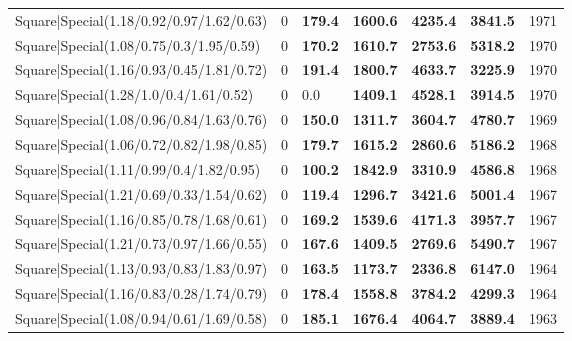 \begin{tabular}{lrllllr}
 Square|Special(1.18/0.92/0.97/1.62/0.63)                      &             0   & \textbf{179.4} & \textbf{1600.6} & \textbf{4235.4} & \textbf{3841.5} &         1971 \\
 Square|Special(1.08/0.75/0.3/1.95/0.59)                       &             0   & \textbf{170.2} & \textbf{1610.7} & \textbf{2753.6} & \textbf{5318.2} &         1970 \\
 Square|Special(1.16/0.93/0.45/1.81/0.72)                      &             0   & \textbf{191.4} & \textbf{1800.7} & \textbf{4633.7} & \textbf{3225.9} &         1970 \\
 Square|Special(1.28/1.0/0.4/1.61/0.52)                        &             0   & 0.0            & \textbf{1409.1} & \textbf{4528.1} & \textbf{3914.5} &         1970 \\
 Square|Special(1.08/0.96/0.84/1.63/0.76)                      &             0   & \textbf{150.0} & \textbf{1311.7} & \textbf{3604.7} & \textbf{4780.7} &         1969 \\
 Square|Special(1.06/0.72/0.82/1.98/0.85)                      &             0   & \textbf{179.7} & \textbf{1615.2} & \textbf{2860.6} & \textbf{5186.2} &         1968 \\
 Square|Special(1.11/0.99/0.4/1.82/0.95)                       &             0   & \textbf{100.2} & \textbf{1842.9} & \textbf{3310.9} & \textbf{4586.8} &         1968 \\
 Square|Special(1.21/0.69/0.33/1.54/0.62)                      &             0   & \textbf{119.4} & \textbf{1296.7} & \textbf{3421.6} & \textbf{5001.4} &         1967 \\
 Square|Special(1.16/0.85/0.78/1.68/0.61)                      &             0   & \textbf{169.2} & \textbf{1539.6} & \textbf{4171.3} & \textbf{3957.7} &         1967 \\
 Square|Special(1.21/0.73/0.97/1.66/0.55)                      &             0   & \textbf{167.6} & \textbf{1409.5} & \textbf{2769.6} & \textbf{5490.7} &         1967 \\
 Square|Special(1.13/0.93/0.83/1.83/0.97)                      &             0   & \textbf{163.5} & \textbf{1173.7} & \textbf{2336.8} & \textbf{6147.0} &         1964 \\
 Square|Special(1.16/0.83/0.28/1.74/0.79)                      &             0   & \textbf{178.4} & \textbf{1558.8} & \textbf{3784.2} & \textbf{4299.3} &         1964 \\
 Square|Special(1.08/0.94/0.61/1.69/0.58)                      &             0   & \textbf{185.1} & \textbf{1676.4} & \textbf{4064.7} & \textbf{3889.4} &         1963 \\

\end{tabular}

